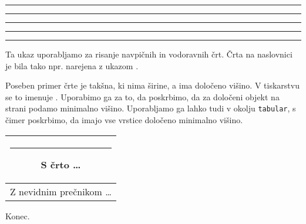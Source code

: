 \newpage
\begin{example}
\rule{3mm}{.1pt}%
\rule[-1mm]{5mm}{1cm}%
\rule{3mm}{.1pt}%
\rule[1mm]{1cm}{5mm}%
\rule{3mm}{.1pt}
\end{example}

\noindent Ta ukaz uporabljamo za risanje navpičnih in vodoravnih črt. 
Črta na naslovnici je bila tako npr. narejena z ukazom .

Poseben primer črte je takšna, ki nima širine, a ima določeno višino. V 
tiskarstvu se to imenuje . Uporabimo ga za to, da poskrbimo,
da za določeni objekt na strani podamo minimalno višino. 
Uporabljamo ga lahko tudi v okolju \texttt{tabular}, s čimer poskrbimo,
da imajo vse vrstice določeno minimalno višino.

\begin{example}
\begin{tabular}{|c|}
\hline
\rule{1pt}{4ex}S črto \ldots\\
\hline
\rule{0pt}{4ex}Z nevidnim 
prečnikom \ldots \\
\hline
\end{tabular}
\end{example}

\bigskip
{\flushright Konec.\par}

%

